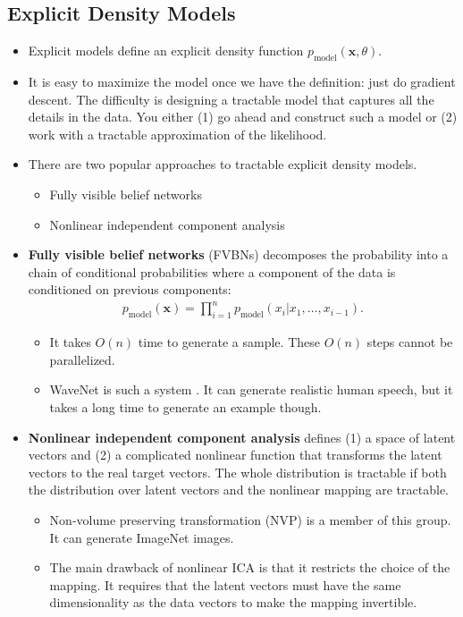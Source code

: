 \documentclass[10pt]{article}
\newcommand{\ve}[1]{\mathbf{#1}}
\begin{document}
  \subsection{Explicit Density Models}

  \begin{itemize}
  	\item Explicit models define an explicit density function $p_{\mathrm{model}}(\ve{x}, \theta)$.

  	\item It is easy to maximize the model once we have the definition: just do gradient descent. The difficulty is designing a tractable model that captures all the details in the data. You either (1) go ahead and construct such a model or (2) work with a tractable approximation of the likelihood.

  	\item There are two popular approaches to tractable explicit density models.
  	\begin{itemize}
  	  \item Fully visible belief networks
  	  \item Nonlinear independent component analysis
  	\end{itemize}

  	\item \textbf{Fully visible belief networks} (FVBNs) decomposes the probability into a chain of conditional probabilities where a component of the data is conditioned on previous components:
	\begin{align*}
      p_{\mathrm{model}}(\ve{x}) 
      = \prod_{i=1}^n p_{\mathrm{model}}(x_i | x_1, \dotsc, x_{i-1}).
    \end{align*}
	\begin{itemize}
	  \item It takes $O(n)$ time to generate a sample. These $O(n)$ steps cannot be parallelized.
	  \item WaveNet is such a system \cite{Oord:2016}. It can generate realistic human speech, but it takes a long time to generate an example though.
	\end{itemize}

	\item \textbf{Nonlinear independent component analysis} defines (1) a space of latent vectors and (2) a complicated nonlinear function that transforms the latent vectors to the real target vectors. The whole distribution is tractable if both the distribution over latent vectors and the nonlinear mapping are tractable.
	\begin{itemize}
	  \item Non-volume preserving transformation (NVP) is a member of this group. It can generate ImageNet images.
	  \item The main drawback of nonlinear ICA is that it restricts the choice of the mapping. It requires that the latent vectors must have the same dimensionality as the data vectors to make the mapping invertible.
	\end{itemize}


\end{itemize}
\end{document}
